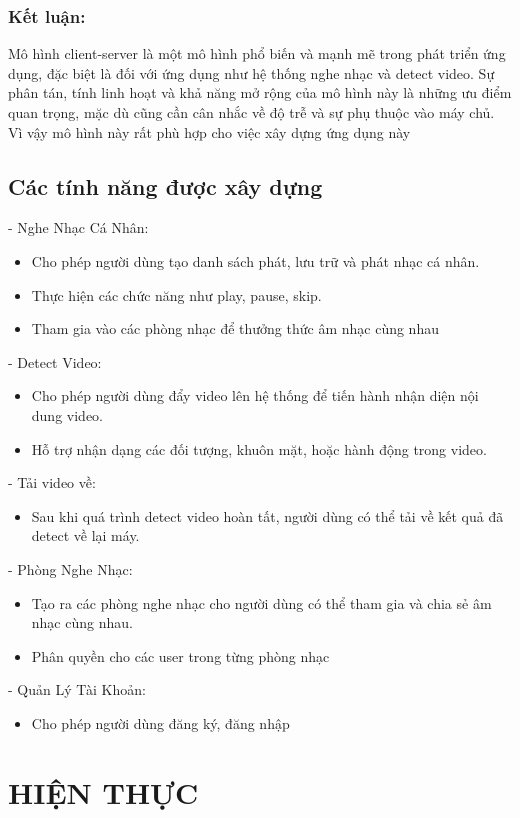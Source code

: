 \documentclass[a4paper]{article}
\begin{document}
\subsubsection{Kết luận:}
Mô hình client-server là một mô hình phổ biến và mạnh mẽ trong phát triển ứng dụng, đặc biệt là đối với ứng dụng như hệ thống nghe nhạc và detect video. Sự phân tán, tính linh hoạt và khả năng mở rộng của mô hình này là những ưu điểm quan trọng, mặc dù cũng cần cân nhắc về độ trễ và sự phụ thuộc vào máy chủ. Vì vậy mô hình này rất phù hợp cho việc xây dựng ứng dụng này 

\subsection{Các tính năng được xây dựng}
- Nghe Nhạc Cá Nhân:
\begin{itemize}
    \item Cho phép người dùng tạo danh sách phát, lưu trữ và phát nhạc cá nhân.
    \item Thực hiện các chức năng như play, pause, skip.
    \item Tham gia vào các phòng nhạc để thưởng thức âm  nhạc cùng nhau
\end{itemize}
- Detect Video:
\begin{itemize}
    \item Cho phép người dùng đẩy video lên hệ thống để tiến hành nhận diện nội dung video.
    \item Hỗ trợ nhận dạng các đối tượng, khuôn mặt, hoặc hành động trong video.
\end{itemize}
- Tải video về:
\begin{itemize}
    \item Sau khi quá trình detect video hoàn tất, người dùng có thể tải về kết quả đã detect về lại máy.
\end{itemize}
- Phòng Nghe Nhạc:
\begin{itemize}
    \item Tạo ra các phòng nghe nhạc cho người dùng có thể tham gia và chia sẻ âm nhạc cùng nhau.
    \item Phân quyền cho các user trong từng phòng nhạc
\end{itemize}
- Quản Lý Tài Khoản:
\begin{itemize}
    \item Cho phép người dùng đăng ký, đăng nhập
\end{itemize}


\section{HIỆN THỰC}
\end{document}
